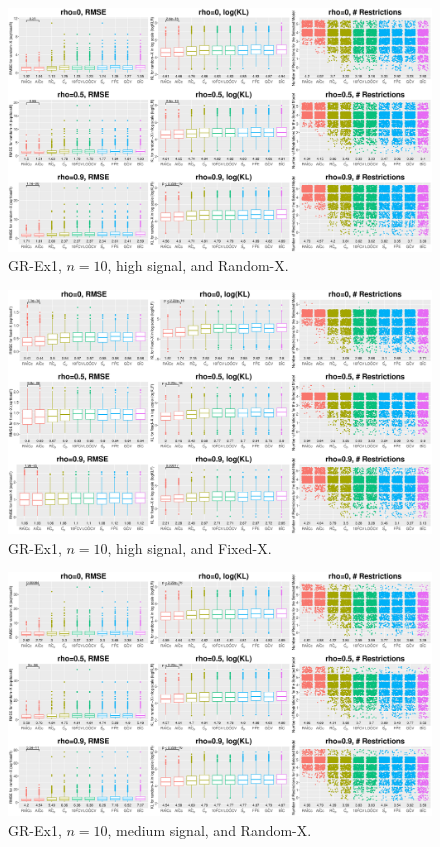 \clearpage
\begin{figure}[!ht]
\centering
\includegraphics[width=\textwidth]{figures/supplement/randomx_GR-Ex1_n10_hsnr.eps}
\caption{GR-Ex1, $n=10$, high signal, and Random-X.}
\end{figure}
\begin{figure}[!ht]
\centering
\includegraphics[width=\textwidth]{figures/supplement/fixedx_GR-Ex1_n10_hsnr.eps}
\caption{GR-Ex1, $n=10$, high signal, and Fixed-X.}
\end{figure}
\clearpage
\begin{figure}[!ht]
\centering
\includegraphics[width=\textwidth]{figures/supplement/randomx_GR-Ex1_n10_msnr.eps}
\caption{GR-Ex1, $n=10$, medium signal, and Random-X.}
\end{figure}
